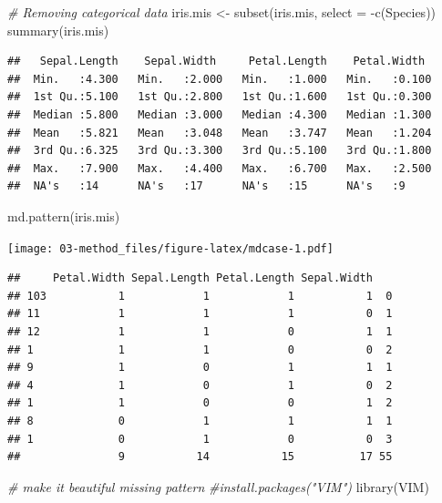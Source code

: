 \documentclass[
]{book}
\newenvironment{Shaded}{\begin{snugshade}}{\end{snugshade}}
\newcommand{\AttributeTok}[1]{\textcolor[rgb]{0.77,0.63,0.00}{#1}}
\newcommand{\CommentTok}[1]{\textcolor[rgb]{0.56,0.35,0.01}{\textit{#1}}}
\newcommand{\FunctionTok}[1]{\textcolor[rgb]{0.00,0.00,0.00}{#1}}
\newcommand{\NormalTok}[1]{#1}
\newcommand{\OtherTok}[1]{\textcolor[rgb]{0.56,0.35,0.01}{#1}}
\newcommand{\SpecialCharTok}[1]{\textcolor[rgb]{0.00,0.00,0.00}{#1}}
\begin{document}
\begin{Shaded}
\begin{Highlighting}[]
\CommentTok{\# Removing categorical data}
\NormalTok{iris.mis }\OtherTok{\textless{}{-}} \FunctionTok{subset}\NormalTok{(iris.mis, }\AttributeTok{select =} \SpecialCharTok{{-}}\FunctionTok{c}\NormalTok{(Species))}
\FunctionTok{summary}\NormalTok{(iris.mis)}
\end{Highlighting}
\end{Shaded}

\begin{verbatim}
##   Sepal.Length    Sepal.Width     Petal.Length    Petal.Width   
##  Min.   :4.300   Min.   :2.000   Min.   :1.000   Min.   :0.100  
##  1st Qu.:5.100   1st Qu.:2.800   1st Qu.:1.600   1st Qu.:0.300  
##  Median :5.800   Median :3.000   Median :4.300   Median :1.300  
##  Mean   :5.821   Mean   :3.048   Mean   :3.747   Mean   :1.204  
##  3rd Qu.:6.325   3rd Qu.:3.300   3rd Qu.:5.100   3rd Qu.:1.800  
##  Max.   :7.900   Max.   :4.400   Max.   :6.700   Max.   :2.500  
##  NA's   :14      NA's   :17      NA's   :15      NA's   :9
\end{verbatim}

\begin{Shaded}
\begin{Highlighting}[]
\FunctionTok{md.pattern}\NormalTok{(iris.mis)}
\end{Highlighting}
\end{Shaded}

\texttt{[image: 03-method\_files/figure-latex/mdcase-1.pdf]}

\begin{verbatim}
##     Petal.Width Sepal.Length Petal.Length Sepal.Width   
## 103           1            1            1           1  0
## 11            1            1            1           0  1
## 12            1            1            0           1  1
## 1             1            1            0           0  2
## 9             1            0            1           1  1
## 4             1            0            1           0  2
## 1             1            0            0           1  2
## 8             0            1            1           1  1
## 1             0            1            0           0  3
##               9           14           15          17 55
\end{verbatim}

\begin{Shaded}
\begin{Highlighting}[]
\CommentTok{\# make it beautiful missing pattern}
\CommentTok{\#install.packages("VIM")}
\FunctionTok{library}\NormalTok{(VIM)}
\end{Highlighting}
\end{Shaded}
\end{document}
